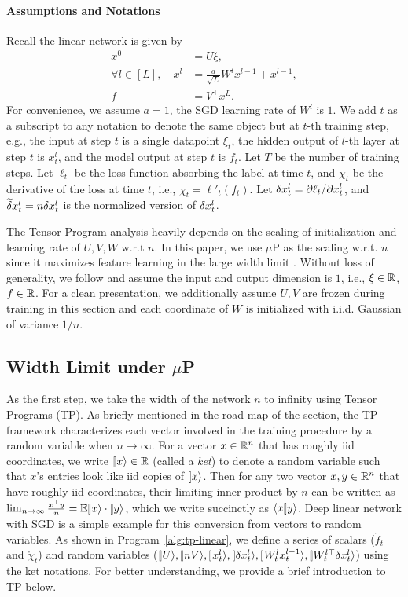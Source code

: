 \documentclass{article}
\theoremstyle{plain}
\theoremstyle{definition}
\begin{document}
\paragraph{Assumptions and Notations}
Recall the linear network is given by
\begin{align*}
    x^0 & = U \xi, \\
    \forall l\in [L], \quad x^l & = \frac a{\sqrt L} W^{l} x^{l-1} + x^{l - 1},  \\
    f &= V^\top x^L.
\end{align*}
For convenience, we assume $a=1$, the SGD learning rate of $W^l$ is $1$. We add $t$ as a subscript to any notation to denote the same object but at $t$-th training step, e.g., the input at step $t$ is a single datapoint $\xi_t$, the hidden output of $l$-th layer at step $t$ is $x_t^l$, and the model output at step $t$ is $f_t$. Let $T$ be the number of training steps. Let $\ell_t$ be the loss function absorbing the label at time $t$, and $\chi_t$ be the derivative of the loss at time $t$, i.e., $\chi_t=\ell'_t(f_t)$. Let $\delta x_t^l=\partial \ell_t/\partial x_t^l$, and $\widetilde{\delta} x_t^l=n \delta x_t^l$ is the normalized version of $\delta x_t^l$.

The Tensor Program analysis heavily depends on the scaling of initialization and learning rate of $U, V, W$ w.r.t $n$. In this paper, we use $\mu$P as the scaling w.r.t. $n$ since it maximizes feature learning in the large width limit \citep{yang2021tensor}. 
Without loss of generality, we follow \cite{yang2021tensor} and assume the input and output dimension is $1$, i.e., $\xi\in \boldsymbol{\mathbb{\mathbb{R}}}$, $f\in \boldsymbol{\mathbb{\mathbb{R}}}$. For a clean presentation, we additionally assume $U, V$ are frozen during training in this section and each coordinate of $W$ is initialized with i.i.d. Gaussian of variance $1/n$.   %

\subsection{Width Limit under $\mu$P}
As the first step, we take the width of the network $n$ to infinity using Tensor Programs (TP). As briefly mentioned in the road map of the section, the TP framework characterizes each vector involved in the training procedure by a random variable when $n\to\infty$. For a vector $x\in\mathbb{R}^{n}$ that has roughly iid coordinates, we write $\ket x \in \R$ (called a \emph{ket}) to denote a random variable such that $x$'s entries look like iid
copies of $\ket{x}$. Then for any two vector $x, y\in \mathbb{R}^n$ that have roughly iid coordinates, their limiting inner product by $n$ can be written as $\lim_{n\to\infty} \frac{x^\top y} n=\E \ket{x}\cdot \ket{y}$, which we write succinctly as $\braket{x}{y}$. %
Deep linear network with SGD is a simple example for this conversion from vectors to random variables. As shown in Program~\ref{alg:tp-linear}, we define a series of scalars ($\mathring f_t$ and $\mathring \chi_t$) and random variables ($\ket{U}, \ket{nV}, \ket{x_t^l}, \ket{\delta x_t^l},\ket{W_t^l x_t^{l-1}}, \ket{W_t^{l\top} \delta x_t^l}$) using the ket notations. For better understanding, we provide a brief introduction to TP below.
\end{document}
